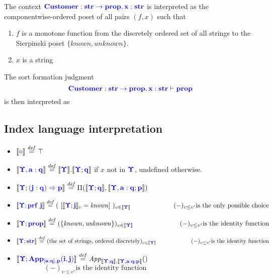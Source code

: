 \documentclass{article}
\newcommand{\blu}[1]{\mathbf{\color{blue}{#1}}}
\newcommand{\sem}[1]{\llbracket #1 \rrbracket}
\newcommand{\defeq}{\overset{\mathit{def}}{=}}
\begin{document}
The context $\blu{Customer : str \to prop,x:str}$ is interpreted as the componentwise-ordered poset of all pairs $(f,x)$ such that
\begin{enumerate}
\item $f$ is a monotone function from the discretely ordered set of all strings to the Sierpinski poset $\{ \mathit{known}, \mathit{unknown} \}$.
\item $x$ is a string
\end{enumerate}
The sort formation judgment
$$\blu{Customer : str \to prop,x:str} \vdash \blu{prop}$$ 
is then interpreted as 

\subsection*{Index language interpretation}

\begin{itemize}
\item $\sem{\blu{\diamond}} \defeq \top$
\item $\sem{\blu{\Upsilon,a:q}} \defeq \sem{\blu{\Upsilon}}.\sem{\blu{\Upsilon};\blu{q}}$ if $x$ not in $\blu{\Upsilon}$, undefined otherwise.
\item $\sem{\blu{\Upsilon}; \blu{(j : q) \Rightarrow p}} \defeq \Pi(\sem{\blu{\Upsilon};\blu{q}},\sem{\blu{\Upsilon,a:q};\blu{p}})$
\item $\sem{\blu{\Upsilon}; \blu{\mathbf{prf}~j}} \defeq (~[ \sem{\blu{\Upsilon}; \blu{j}}_\upsilon = \mathit{known} ]~)_{\upsilon \in \sem{\blu{\Upsilon}}}\\ ~~~~~~~~~~~~~~~~~~~~(-)_{\upsilon \leq \upsilon'} \text{is the only possible choice}$
\item $\sem{\blu{\Upsilon}; \blu{prop}} \defeq ( \{ \mathit{known}, \mathit{unknown} \} )_{\upsilon \in \sem{\blu{\Upsilon}}}  \\ ~~~~~~~~~~~~~~~~~~~~~(-)_{\upsilon \leq \upsilon'} \text{is the identity function}$
\item $\sem{\blu{\Upsilon}; \blu{str}} \defeq (\text{the set of strings, ordered discretely})_{\upsilon \in \sem{\blu{\Upsilon}}} \\ ~~~~~~~~~~~~~~~~~~(-)_{\upsilon \leq \upsilon'} \text{is the identity function}$
\item $\sem{\blu{\Upsilon}; \blu{App_{[a:q],p}(i,j)}} \defeq \mathit{App}_{\sem{\blu{\Upsilon;q}},\sem{\blu{\Upsilon,a:q;p}}}()$ \\ $~~~~~~~~~~~~~~~~~~(-)_{\upsilon \leq \upsilon'} \text{is the identity function}$
\end{itemize}
\end{document}
